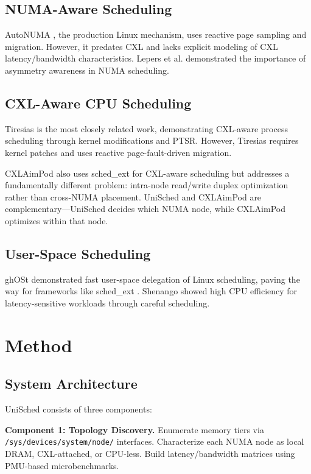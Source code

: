 \documentclass[11pt]{article}
\begin{document}
\subsection{NUMA-Aware Scheduling}

AutoNUMA \citep{arcangeli2012autonuma}, the production Linux mechanism, uses reactive page sampling and migration. However, it predates CXL and lacks explicit modeling of CXL latency/bandwidth characteristics. Lepers et al. \citep{lepers2015thread} demonstrated the importance of asymmetry awareness in NUMA scheduling.

\subsection{CXL-Aware CPU Scheduling}

Tiresias \citep{tang2024tiresias} is the most closely related work, demonstrating CXL-aware process scheduling through kernel modifications and PTSR. However, Tiresias requires kernel patches and uses reactive page-fault-driven migration.

CXLAimPod \citep{yang2025cxlaimpod} also uses sched_ext for CXL-aware scheduling but addresses a fundamentally different problem: intra-node read/write duplex optimization rather than cross-NUMA placement. UniSched and CXLAimPod are complementary---UniSched decides which NUMA node, while CXLAimPod optimizes within that node.

\subsection{User-Space Scheduling}

ghOSt \citep{humphries2021ghost} demonstrated fast user-space delegation of Linux scheduling, paving the way for frameworks like sched_ext \citep{vernet2024schedext}. Shenango \citep{fried2019shenango} showed high CPU efficiency for latency-sensitive workloads through careful scheduling.

\section{Method}

\subsection{System Architecture}

UniSched consists of three components:

\textbf{Component 1: Topology Discovery.} Enumerate memory tiers via \texttt{/sys/devices/system/node/} interfaces. Characterize each NUMA node as local DRAM, CXL-attached, or CPU-less. Build latency/bandwidth matrices using PMU-based microbenchmarks.
\end{document}
